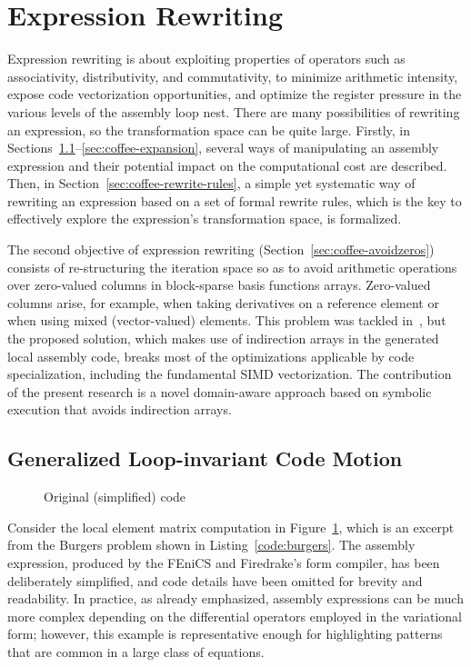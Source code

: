 
\section{Expression Rewriting}
\label{sec:coffee-expr-rewrite}

Expression rewriting is about exploiting properties of operators such as associativity, distributivity, and commutativity, to minimize arithmetic intensity, expose code vectorization opportunities, and optimize the register pressure in the various levels of the assembly loop nest. There are many possibilities of rewriting an expression, so the transformation space can be quite large. Firstly, in Sections~\ref{sec:coffee-licm}--\ref{sec:coffee-expansion}, several ways of manipulating an assembly expression and their potential impact on the computational cost are described. Then, in Section~\ref{sec:coffee-rewrite-rules}, a simple yet systematic way of rewriting an expression based on a set of formal rewrite rules, which is the key to effectively explore the expression's transformation space, is formalized. 

The second objective of expression rewriting (Section~\ref{sec:coffee-avoidzeros}) consists of re-structuring the iteration space so as to avoid arithmetic operations over zero-valued columns in block-sparse basis functions arrays. Zero-valued columns arise, for example, when taking derivatives on a reference element or when using mixed (vector-valued) elements. This problem was tackled in~\cite{quadrature-olegaard}, but the proposed solution, which makes use of indirection arrays in the generated local assembly code, breaks most of the optimizations applicable by code specialization, including the fundamental SIMD vectorization. The contribution of the present research is a novel domain-aware approach based on symbolic execution that avoids indirection arrays.

\subsection{Generalized Loop-invariant Code Motion}
\label{sec:coffee-licm}

\begin{figure}
\centering
\label{code:original-code}
\footnotesize

\caption{Original (simplified) code}
\end{figure}

Consider the local element matrix computation in Figure~\ref{code:original-code}, which is an excerpt from the Burgers problem shown in Listing~\ref{code:burgers}. The assembly expression, produced by the FEniCS and Firedrake's form compiler, has been deliberately simplified, and code details have been omitted for brevity and readability. In practice, as already emphasized, assembly expressions can be much more complex depending on the differential operators employed in the variational form; however, this example is representative enough for highlighting patterns that are common in a large class of equations. 

